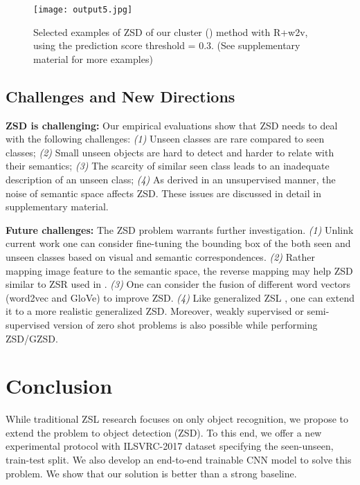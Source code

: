 \documentclass[runningheads]{llncs}
\begin{document}
\begin{figure}[t]
 \centering
 \texttt{[image: output5.jpg]}
\vspace{-2.1em}
   \caption{Selected examples of ZSD of our cluster ()  method with R+w2v, using the prediction score threshold = 0.3. (See supplementary material for more examples) 
}
\label{fig:output}
\end{figure}



\subsection{Challenges and New Directions}\label{sec:further}
\textbf{ZSD is challenging:} Our empirical evaluations show that ZSD needs to deal with the following challenges: \emph{(1)} Unseen classes are rare compared to seen classes; \emph{(2)} Small unseen objects are hard to detect and harder to relate with their semantics; \emph{(3)} The scarcity of similar seen class leads to an inadequate description of an unseen class; \emph{(4)} As derived in an unsupervised manner, the noise of semantic space affects ZSD. These issues are discussed in detail in supplementary material.






       




\noindent \textbf{Future challenges:} The ZSD problem warrants further investigation. \emph{(1)} Unlink current work one can consider fine-tuning the bounding box of the both seen and unseen classes based on visual and semantic correspondences. \emph{(2)} Rather mapping image feature to the semantic space, the reverse mapping may help ZSD similar to ZSR used in \cite{Kodirov_2017_CVPR,Zhang_2017_CVPR}. \emph{(3)} One can consider the fusion of different word vectors (word2vec and GloVe) to improve ZSD. \emph{(4)} Like generalized ZSL \cite{Xu_Matrix_CVPR_2017,Xian_CVPR_2017,Li_2017_CVPR}, one can extend it to a more realistic generalized ZSD. Moreover, weakly supervised or semi-supervised version of zero shot problems is also possible while performing ZSD/GZSD. 
 
    
\vspace{-0.5em}
\section{Conclusion}
\vspace{-0.5em}
While traditional ZSL research focuses on only object recognition, we propose to extend the problem to object detection (ZSD). To this end, we offer a new experimental protocol with ILSVRC-2017 dataset specifying the seen-unseen, train-test split. We also develop an end-to-end trainable CNN model to solve this problem. We show that our solution is better than a strong baseline.
\end{document}
